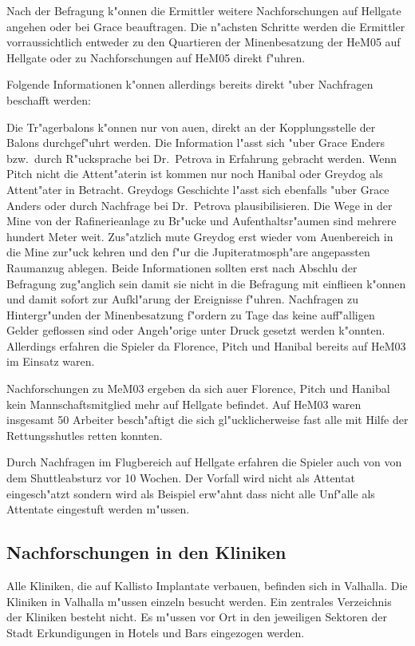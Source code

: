 Nach der Befragung k"onnen die Ermittler weitere Nachforschungen auf Hellgate angehen oder bei Grace beauftragen. Die n"achsten Schritte werden die Ermittler vorraussichtlich entweder zu den Quartieren der Minenbesatzung der HeM05 auf Hellgate oder zu Nachforschungen auf HeM05 direkt f"uhren.

Folgende Informationen k"onnen allerdings bereits direkt "uber Nachfragen beschafft werden:

Die Tr"agerbalons k"onnen nur von au\3en, direkt an der Kopplungsstelle der Balons durchgef"uhrt werden. Die Information l"asst sich "uber Grace Enders bzw.~durch R"ucksprache bei Dr.~Petrova in Erfahrung gebracht werden. Wenn Pitch nicht die Attent"aterin ist kommen nur noch Hanibal oder Greydog als Attent"ater in Betracht. Greydogs Geschichte l"asst sich ebenfalls "uber Grace Anders oder durch Nachfrage bei Dr.~Petrova plausibilisieren. Die Wege in der Mine von der Rafinerieanlage zu Br"ucke und Aufenthaltsr"aumen sind mehrere hundert Meter weit. Zus"atzlich mu\3te Greydog erst wieder vom Au\3enbereich in die Mine zur"uck kehren und den f"ur die Jupiteratmosph"are angepassten Raumanzug ablegen. Beide Informationen sollten erst nach Abschlu\3 der Befragung zug"anglich sein damit sie nicht in die Befragung mit einflie\3en k"onnen und damit sofort zur Aufkl"arung der Ereignisse f"uhren. Nachfragen zu Hintergr"unden der Minenbesatzung f"ordern zu Tage das keine auff"alligen Gelder geflossen sind oder Angeh"orige unter Druck gesetzt werden k"onnten. Allerdings erfahren die Spieler da\3 Florence, Pitch und Hanibal bereits auf HeM03 im Einsatz waren.

Nachforschungen zu MeM03 ergeben da\3 sich au\3er Florence, Pitch und Hanibal kein Mannschaftsmitglied mehr auf Hellgate befindet. Auf HeM03 waren insgesamt 50 Arbeiter besch"aftigt die sich gl"ucklicherweise fast alle mit Hilfe der Rettungsshutles retten konnten.


Durch Nachfragen im Flugbereich auf Hellgate erfahren die Spieler auch von von dem Shuttleabsturz vor 10 Wochen. Der Vorfall wird nicht als Attentat eingesch"atzt sondern wird als Beispiel erw"ahnt dass nicht alle Unf"alle als Attentate eingestuft werden m"ussen.


\subsection{Nachforschungen in den Kliniken}

Alle Kliniken, die auf Kallisto Implantate verbauen, befinden sich in Valhalla. Die Kliniken in Valhalla m"ussen einzeln besucht werden. Ein zentrales Verzeichnis der Kliniken besteht nicht. Es m"ussen vor Ort in den jeweiligen Sektoren der Stadt Erkundigungen in Hotels und Bars eingezogen werden.

